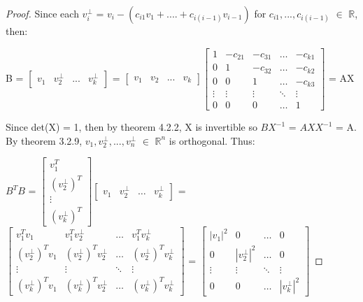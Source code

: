     \begin{proof}
        Since each $v_i^{\perp}$ = $v_i - (c_{i1}v_1 + .... + c_{i(i-1)}v_{i-1})$
        for $c_{i1},...,c_{i(i-1)}$ $\in$ $\mathbb{R}$, then:

        \footnotesize
        \hspace{0.5cm}
        B =
        $\begin{bmatrix}
            v_1 & v_2^{\perp} & ... & v_k^{\perp}
        \end{bmatrix}$ =
        $\begin{bmatrix}
            v_1 & v_2 & ... & v_k
        \end{bmatrix}
        \begin{bmatrix}
            1 & -c_{21} & -c_{31} & \hdots & -c_{k1} \\
            0 & 1 & -c_{32} & \hdots & -c_{k2} \\
            0 & 0 & 1 & \hdots & -c_{k3} \\
            \vdots & \vdots & \vdots & \ddots & \vdots \\
            0 & 0 & 0 & \hdots & 1
        \end{bmatrix}$
        = AX
        \normalsize

        Since det(X) = 1, then by {\color{red} theorem 4.2.2}, X is invertible
        so $BX^{-1}$ = $AXX^{-1}$ = A.
        By {\color{red} theorem 3.2.9},
        $v_1,v_2^{\perp},...,v_n^{\perp}$ $\in$ $\mathbb{R}^n$
        is orthogonal. Thus:

        \footnotesize
        $B^TB$ =
        $\begin{bmatrix}
            v_1^T \\
            (v_2^{\perp})^T \\
            \vdots \\
            (v_k^{\perp})^T
        \end{bmatrix}
        \begin{bmatrix}
            v_1 & v_2^{\perp} & \hdots & v_k^{\perp}
        \end{bmatrix}$ =
        $\begin{bmatrix}
            v_1^Tv_1 & v_1^Tv_2^{\perp} & \hdots & v_1^Tv_k^{\perp} \\
            (v_2^{\perp})^Tv_1 & (v_2^{\perp})^Tv_2^{\perp}
                & \hdots & (v_2^{\perp})^Tv_k^{\perp} \\
            \vdots & \vdots & \ddots & \vdots \\
            (v_k^{\perp})^Tv_1 & (v_k^{\perp})^Tv_2^{\perp}
                & \hdots & (v_k^{\perp})^Tv_k^{\perp}
        \end{bmatrix}$ =
        $\begin{bmatrix}
            |v_1|^2 & 0 & \hdots & 0 \\
            0 & |v_2^{\perp}|^2 & \hdots & 0 \\
            \vdots & \vdots & \ddots & \vdots \\
            0 & 0 & \hdots & |v_k^{\perp}|^2
        \end{bmatrix}$
        \normalsize


\end{proof}
